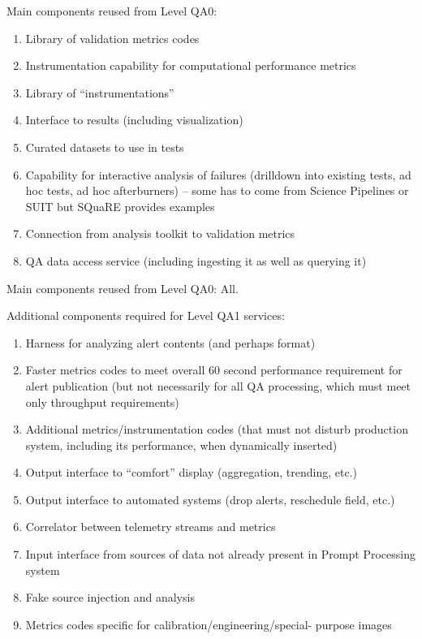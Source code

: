 Main components reused from Level QA0:
\begin{enumerate}
\item Library of validation metrics codes
\item Instrumentation capability for computational performance metrics
\item Library of “instrumentations”
\item Interface to results (including visualization)
\item Curated datasets to use in tests
\item Capability for interactive analysis of failures (drilldown into existing tests, ad hoc tests, ad hoc afterburners) – some has to come from Science Pipelines or SUIT but SQuaRE provides examples
\item Connection from analysis toolkit to validation metrics
\item QA data access service (including ingesting it as well as querying it)
\end{enumerate}

Main components reused from Level QA0: All.

Additional components required for Level QA1 services:

\begin{enumerate}
\item Harness for analyzing alert contents (and perhaps format)
\item Faster metrics codes to meet overall 60 second performance requirement for alert publication (but not necessarily for all QA processing, which must meet only throughput requirements)
\item Additional metrics/instrumentation codes (that must not disturb production system, including its performance, when dynamically inserted)
\item Output interface to “comfort” display (aggregation, trending, etc.)
\item Output interface to automated systems (drop alerts, reschedule field, etc.)
\item Correlator between telemetry streams and metrics
\item Input interface from sources of data not already present in Prompt Processing system
\item Fake source injection and analysis
\item Metrics codes specific for calibration/engineering/special- purpose images
\end{enumerate}

